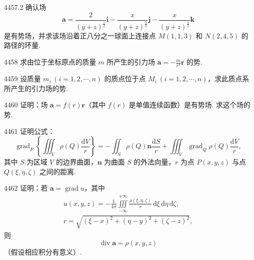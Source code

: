\begin{prob}[M]{4457.2}
确认场
\[
\boldsymbol{a} = \frac{2}{(y+z)^{\frac{1}{2}}}\boldsymbol{i} - \frac{x}{(y+z)^{\frac{3}{2}}}\boldsymbol{j} - \frac{x}{(y+z)^{\frac{3}{2}}}\boldsymbol{k}
\]
是有势场，并求该场沿着正八分之一球面上连接点 $M(1,1,3)$ 和 $N(2,4,5)$ 的路径的环量.
\end{prob}

\begin{prob}[S]{4458}
求由位于坐标原点的质量 $m$ 所产生的引力场 $\boldsymbol{a} = -\frac{m}{r^3}\boldsymbol{r}$ 的势.
\end{prob}

\begin{prob}[S]{4459}
设质量 $m_i\ (i=1,2,\cdots,n)$ 的质点位于点 $M_i\ (i=1,2,\cdots,n)$，求此质点系所产生的引力场的势.
\end{prob}

\begin{prob}[M]{4460}
证明：场 $\boldsymbol{a} = f(r)\boldsymbol{r}$（其中 $f(r)$ 是单值连续函数）是有势场. 求这个场的势.
\end{prob}

\begin{prob}[M]{4461}
证明公式：
\[
\operatorname{grad}_P \left\{ \iiint_V \rho(Q) \frac{\mathrm{d}V}{r} \right\} = -\iint_S \rho(Q)\boldsymbol{n}\frac{\mathrm{d}S}{r} + \iiint_V \operatorname{grad}_Q \rho(Q)\frac{\mathrm{d}V}{r},
\]
其中 $S$ 为区域 $V$ 的边界曲面，$\boldsymbol{n}$ 为曲面 $S$ 的外法向量，$r$ 为点 $P(x,y,z)$ 与点 $Q(\xi,\eta,\zeta)$ 之间的距离.
\end{prob}

\begin{prob}[M]{4462}
证明：若 $\boldsymbol{a} = \operatorname{grad} u$，其中
\begin{gather*}
u(x,y,z) = -\frac{1}{4\pi} \iiint\limits_{-\infty}^{+\infty} \frac{\rho(\xi,\eta,\zeta)}{r} \,\mathrm{d}\xi\,\mathrm{d}\eta\,\mathrm{d}\zeta, \\
r = \sqrt{(\xi-x)^2 + (\eta-y)^2 + (\zeta-z)^2},
\end{gather*}
则
\[
\operatorname{div}\boldsymbol{a} = \rho(x,y,z)
\]
（假设相应积分有意义）.
\end{prob}

